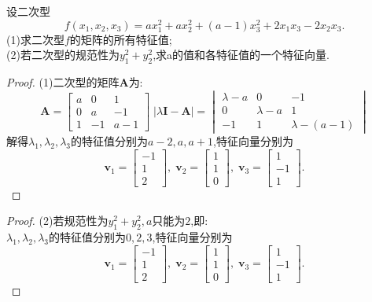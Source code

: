 \documentclass[lang=cn,11pt,normal]{elegantbook}
\begin{document}
	\begin{exercise}
		设二次型
		$$
		f(x_1,x_2,x_3)=ax_1^2+ax_2^2+(a-1)x_3^2+2x_1x_3-2x_2x_3.
		$$
		(1)求二次型$f$的矩阵的所有特征值;\\
		(2)若二次型的规范性为$y_1^2+y_2^2$,求a的值和各特征值的一个特征向量.
	\end{exercise}
	\begin{proof}
		(1)二次型的矩阵$\boldsymbol{A}$为:
		$$
		\boldsymbol{A}=
		\begin{bmatrix}
		a&0&1\\
		0&a&-1\\
		1&-1&a-1
		\end{bmatrix}\;
		|\lambda\boldsymbol{I}-\boldsymbol{A}|=
		\begin{vmatrix}
		\lambda-a&0&-1\\
		0&\lambda-a&1\\
		-1&1&\lambda-(a-1)
		\end{vmatrix}
		$$
		解得$\lambda_1,\lambda_2,\lambda_3$的特征值分别为$a-2,a,a+1$,特征向量分别为$$\boldsymbol{v}_1=\begin{bmatrix}-1\\1\\2\end{bmatrix},\;\boldsymbol{v}_2=\begin{bmatrix}1\\1\\0\end{bmatrix},\;\boldsymbol{v}_3=\begin{bmatrix}1\\-1\\1\end{bmatrix}.$$
	\end{proof}
	\begin{proof}
		(2)若规范性为$y_1^2+y_2^2,a$只能为$2$,即:\\
		$\lambda_1,\lambda_2,\lambda_3$的特征值分别为$0,2,3$,特征向量分别为$$\boldsymbol{v}_1=\begin{bmatrix}-1\\1\\2\end{bmatrix},\;\boldsymbol{v}_2=\begin{bmatrix}1\\1\\0\end{bmatrix},\;\boldsymbol{v}_3=\begin{bmatrix}1\\-1\\1\end{bmatrix}.$$
	\end{proof}
\end{document}
